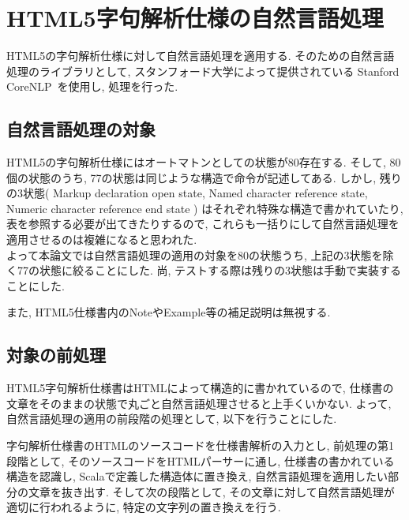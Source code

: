 \documentclass[uplatex,a4j]{jsreport}
\begin{document}
\chapter{HTML5字句解析仕様の自然言語処理}
HTML5の字句解析仕様に対して自然言語処理を適用する. 
そのための自然言語処理のライブラリとして, スタンフォード大学によって提供されている Stanford CoreNLP~\cite{manning-EtAl:2014:P14-5}を使用し, 処理を行った.

\label{自然言語処理}
\section{自然言語処理の対象}
HTML5の字句解析仕様にはオートマトンとしての状態が80存在する. 
そして, 80個の状態のうち, 77の状態は同じような構造で命令が記述してある. 
しかし, 残りの3状態(
Markup declaration open state, 
Named character reference state, 
Numeric character reference end state
)
はそれぞれ特殊な構造で書かれていたり, 表を参照する必要が出てきたりするので, これらも一括りにして自然言語処理を適用させるのは複雑になると思われた. \\
よって本論文では自然言語処理の適用の対象を80の状態うち, 上記の3状態を除く77の状態に絞ることにした.
尚, テストする際は残りの3状態は手動で実装することにした.

また, HTML5仕様書内のNoteやExample等の補足説明は無視する.

\section{対象の前処理}
HTML5字句解析仕様書はHTMLによって構造的に書かれているので, 仕様書の文章をそのままの状態で丸ごと自然言語処理させると上手くいかない.
よって, 自然言語処理の適用の前段階の処理として, 以下を行うことにした.

字句解析仕様書のHTMLのソースコードを仕様書解析の入力とし, 
前処理の第1段階として, そのソースコードをHTMLパーサーに通し, 仕様書の書かれている構造を認識し, Scalaで定義した構造体に置き換え, 自然言語処理を適用したい部分の文章を抜き出す. 
そして次の段階として, その文章に対して自然言語処理が適切に行われるように, 特定の文字列の置き換えを行う. 

\end{document}
